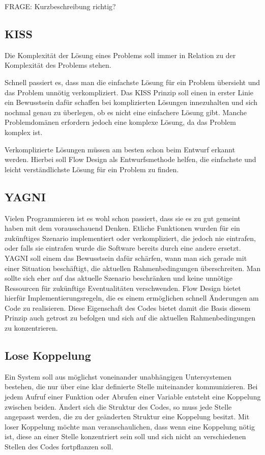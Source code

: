 \documentclass[a4paper,12pt,oneside]{book}
\begin{document}
FRAGE: Kurzbeschreibung richtig?

\subsection{KISS}
\label{sec-1-2-1}
Die Komplexität der Lösung eines Problems soll immer in Relation zu der
Komplexität des Problems stehen.

Schnell passiert es, dass man die einfachste Lösung für ein Problem übersieht und das Problem unnötig verkompliziert.
Das KISS Prinzip soll einen in erster Linie ein Bewusstsein dafür schaffen bei
komplizierten Lösungen innezuhalten und sich nochmal genau zu
überlegen, ob es nicht eine einfachere Lösung gibt.
Manche Problemdomänen erfordern jedoch eine komplexe Lösung, da das Problem
komplex ist.

Verkomplizierte Lösungen müssen am besten schon beim Entwurf erkannt werden.
Hierbei soll Flow Design als Entwurfsmethode helfen, die einfachste und leicht
verständlichste Lösung für ein Problem zu finden.

\subsection{YAGNI}
\label{sec-1-2-2}
Vielen Programmieren ist es wohl schon passiert, dass sie es zu gut gemeint
haben mit dem vorausschauend Denken. Etliche Funktionen wurden für ein
zukünftiges Szenario implementiert oder verkompliziert, die jedoch nie
eintrafen, oder falls sie eintrafen wurde die Software bereits durch eine
andere ersetzt.
YAGNI soll einem das Bewusstsein dafür schärfen, wann man sich gerade mit einer
Situation beschäftigt, die aktuellen Rahmenbedingungen überschreiten.
Man sollte sich eher auf das aktuelle Szenario beschränken  und keine unnötige Ressourcen für zukünftige
Eventualitäten verschwenden.
Flow Design bietet hierfür Implementierungsregeln, die es einem ermöglichen
schnell Änderungen am Code zu realisieren.
Diese Eigenschaft des Codes bietet damit die Basis diesem Prinzip auch getrost
zu befolgen und sich auf die aktuellen Rahmenbedingungen zu konzentrieren.

\subsection{Lose Koppelung}
\label{sec-1-2-3}
Ein System soll aus möglichst voneinander unabhängigen Untersystemen bestehen,
die nur über eine  klar definierte Stelle miteinander kommunizieren.
Bei jedem Aufruf einer Funktion oder Abrufen einer Variable entsteht eine
Koppelung zwischen beiden.
Ändert sich die Struktur des Codes, so muss jede Stelle angepasst werden, die zu
der geänderten Struktur eine Koppelung besitzt. Mit loser Koppelung möchte man
veranschaulichen, dass wenn eine Koppelung nötig ist, diese an einer Stelle konzentriert sein soll und
sich nicht an verschiedenen Stellen des Codes fortpflanzen soll.
\end{document}
